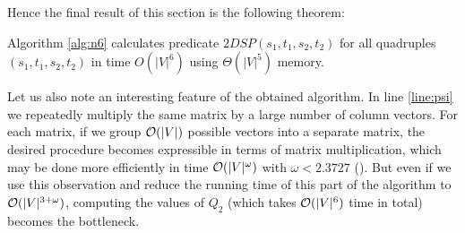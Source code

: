 Hence the final result of this section is the following theorem:
\begin{theorem}
Algorithm \ref{alg:n6} calculates predicate $2DSP(s_1, t_1, s_2, t_2)$ for all quadruples $(s_1, t_1, s_2, t_2)$ in time $O(|V|^6)$ using $\Theta(|V|^5)$ memory. 
\end{theorem}

Let us also note an interesting feature of the obtained algorithm. In line \ref{line:psi} we repeatedly multiply the same matrix by a large number of column vectors. For each matrix, if we group $\mathcal{O}(|V|)$ possible vectors into a separate matrix, the desired procedure becomes expressible in terms of matrix multiplication, which may be done more efficiently in time $\mathcal{O}(|V|^\omega)$ with $\omega < 2.3727$ (\cite{Williams}). But even if we use this observation and reduce the running time of this part of the algorithm to $\mathcal{O}(|V|^{{3 + \omega}})$, computing the values of $Q_2$ (which takes $\mathcal{O}(|V|^6)$ time in total) becomes the bottleneck.
